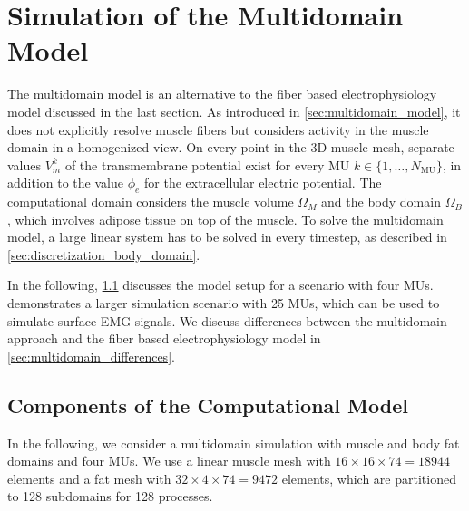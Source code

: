 

\section{Simulation of the Multidomain Model}\label{sec:solver_multidomain_model}

The multidomain model is an alternative to the fiber based electrophysiology model discussed in the last section.
As introduced in \cref{sec:multidomain_model}, it does not explicitly resolve muscle fibers but considers activity in the muscle domain in a homogenized view.
On every point in the 3D muscle mesh, separate values $V_m^k$ of the transmembrane potential exist for every MU $k \in \{1,\dots,N_\text{MU}\}$, in addition to the value $\phi_e$ for the extracellular electric potential. 
The computational domain considers the muscle volume $\Omega_M$ and the body domain $\Omega_B$, which involves  adipose tissue on top of the muscle.
To solve the multidomain model, a large linear system has to be solved in every timestep, as described in \cref{sec:discretization_body_domain}.

In the following, \cref{sec:multidomain_components} discusses the model setup for a scenario with four MUs.  demonstrates a larger simulation scenario with 25 MUs, which can be used to simulate surface EMG signals. We discuss differences between the multidomain approach and the fiber based electrophysiology model in \cref{sec:multidomain_differences}.

\subsection{Components of the Computational Model}\label{sec:multidomain_components}

In the following, we consider a multidomain simulation with muscle and body fat domains and four MUs. We use a linear muscle mesh with $16 \times 16 \times 74 = \num{18944}$ elements and a fat mesh with $32 \times 4 \times 74 = \num{9472}$ elements, which are partitioned to 128 subdomains for 128 processes. 

